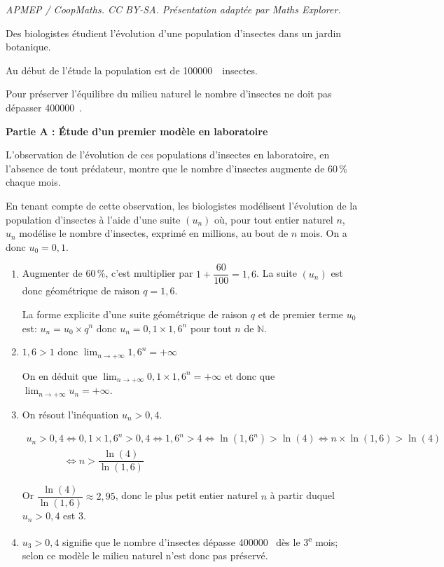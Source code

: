 \documentclass[10pt]{article}
\providecommand{\ieme}{\textsuperscript{e}}
\providecommand{\N}{\mathbb{N}}
\providecommand{\np}[2][]{{#2~#1}}
\providecommand{\ds}{\displaystyle}
\begin{document}
\noindent\textit{APMEP / CoopMaths. CC BY-SA. Présentation adaptée par Maths Explorer.}\par\medskip
\medskip

Des biologistes étudient l'évolution d'une population d'insectes dans un jardin botanique. 

Au début de l'étude la population est de \np{100000}~insectes.

Pour préserver l'équilibre du milieu naturel le nombre d'insectes ne doit pas dépasser \np{400000}.

\bigskip

\textbf{Partie A : Étude d'un premier modèle en laboratoire}

\medskip

L'observation de l'évolution de ces populations d'insectes en laboratoire, en l'absence de tout prédateur, montre que le nombre d'insectes augmente de 60\,\% chaque mois.

En tenant compte de cette observation, les biologistes modélisent l'évolution de la population d'insectes à l'aide d'une suite $\left(u_n\right)$ où, pour tout entier naturel $n$, $u_n$ modélise le nombre d'insectes, exprimé en millions, au bout de $n$ mois. 
On a donc $u_0 = 0,1$.

\medskip

\begin{enumerate}
\item 
Augmenter de 60\,\%, c'est multiplier par $1+\dfrac{60}{100}=1,6$.
La suite $(u_n)$ est donc géométrique de raison $q=1,6$.

La forme explicite d'une suite géométrique de raison $q$ et de premier terme $u_0$ est: $u_n=u_0\times q^n$ donc $u_n = 0,1 \times 1,6^n$ pour tout $n$ de $\N$.

\item 
$1,6>1$ donc $\ds\lim_{n\to +\infty} 1,6^n = +\infty$

On en déduit que $\ds\lim_{n\to +\infty} 0,1\times 1,6^n = +\infty$ et donc que $\ds\lim_{n\to +\infty} u_n = +\infty$.

\item On résout l'inéquation $u_n > 0,4$.

$\begin{gathered}u_n>0,4
\iff
0,1\times 1,6^n >0,4
\iff
1,6^n >4
\iff
\ln\left (1,6^n\right ) > \ln(4)
\iff
n\times \ln(1,6)>\ln(4)\\
\phantom{u_n>0,4}
\iff
n>\dfrac{\ln(4)}{\ln(1,6)}\end{gathered}$

Or $\dfrac{\ln(4)}{\ln(1,6)}\approx 2,95$, donc le plus petit entier naturel $n$ à partir duquel $u_n>0,4$ est 3.

\item 
$u_3>0,4$ signifie que le nombre d'insectes dépasse \np{400000} dès le 3\ieme{} mois; selon ce modèle le milieu naturel n'est donc pas préservé.

\end{enumerate}
\end{document}
